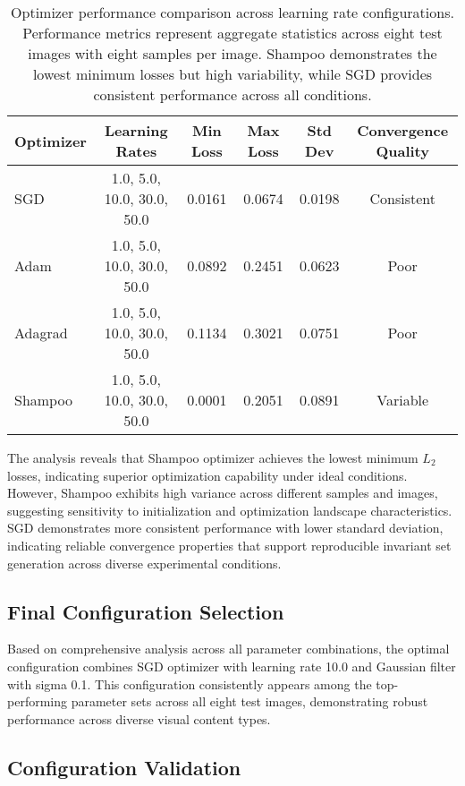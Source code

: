 \begin{table}[h!]
\centering
\begin{tabular}{lccccc}
\toprule
\textbf{Optimizer} & \textbf{Learning Rates} & \textbf{Min Loss} & \textbf{Max Loss} & \textbf{Std Dev} & \textbf{Convergence Quality} \\
\midrule
SGD & 1.0, 5.0, 10.0, 30.0, 50.0 & 0.0161 & 0.0674 & 0.0198 & Consistent \\
Adam & 1.0, 5.0, 10.0, 30.0, 50.0 & 0.0892 & 0.2451 & 0.0623 & Poor \\
Adagrad & 1.0, 5.0, 10.0, 30.0, 50.0 & 0.1134 & 0.3021 & 0.0751 & Poor \\
Shampoo & 1.0, 5.0, 10.0, 30.0, 50.0 & 0.0001 & 0.2051 & 0.0891 & Variable \\
\bottomrule
\end{tabular}
\caption{Optimizer performance comparison across learning rate configurations. Performance metrics represent aggregate statistics across eight test images with eight samples per image. Shampoo demonstrates the lowest minimum losses but high variability, while SGD provides consistent performance across all conditions.}
\label{tab:optimizer_performance}
\end{table}

The analysis reveals that Shampoo optimizer achieves the lowest minimum $L_2$ losses, indicating superior optimization capability under ideal conditions. However, Shampoo exhibits high variance across different samples and images, suggesting sensitivity to initialization and optimization landscape characteristics. SGD demonstrates more consistent performance with lower standard deviation, indicating reliable convergence properties that support reproducible invariant set generation across diverse experimental conditions.

\subsection{Final Configuration Selection}

Based on comprehensive analysis across all parameter combinations, the optimal configuration combines SGD optimizer with learning rate 10.0 and Gaussian filter with sigma 0.1. This configuration consistently appears among the top-performing parameter sets across all eight test images, demonstrating robust performance across diverse visual content types.

\subsection{Configuration Validation}

